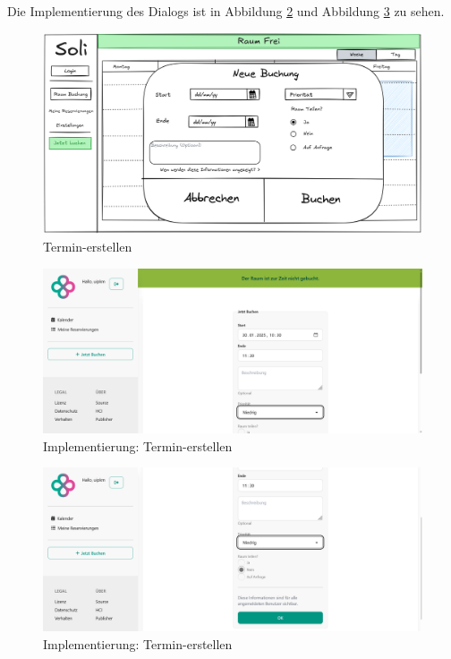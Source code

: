 Die Implementierung des Dialogs ist in Abbildung \ref{fig:impl-buchung1} und Abbildung \ref{fig:impl-buchung2} zu sehen.

\begin{figure}[ht]
    \centering
    \includegraphics[width=\textwidth]{figures/mockup/bookings_create_form}
    \caption{Termin-erstellen}
    \label{fig:buchung}
\end{figure}
\pagebreak

\begin{figure}[ht]
    \centering
    \includegraphics[width=\textwidth]{figures/impl-views/bookings_create_form_1}
    \caption{Implementierung: Termin-erstellen}
    \label{fig:impl-buchung1}
\end{figure}

\begin{figure}[ht]
    \centering
    \includegraphics[width=\textwidth]{figures/impl-views/bookings_create_form_2}
    \caption{Implementierung: Termin-erstellen}
    \label{fig:impl-buchung2}
\end{figure}
\clearpage

